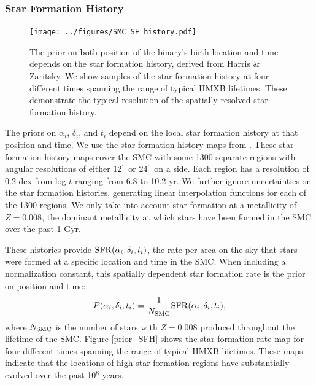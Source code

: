 \documentclass[usenatbib]{mnras}
\newcommand{\amin}{\ifmmode {^{\prime}\ }\else$^{\prime}$\fi}
\begin{document}
\subsubsection{Star Formation History}

\begin{figure}
\begin{center}
\texttt{[image: ../figures/SMC\_SF\_history.pdf]}
\caption{The prior on both position of the binary's birth location and time depends on the star formation history, derived from Harris \& Zaritsky. We show samples of the star formation history at four different times spanning the range of typical HMXB lifetimes. These demonstrate the typical resolution of the spatially-resolved star formation history.}
\label{fig:prior_SFH}
\end{center}
\end{figure}

The priors on $\alpha_i$, $\delta_i$, and $t_i$ depend on the local star formation history at that position and time. We use the star formation history maps from \citet{harris??}. These star formation history maps cover the SMC with some 1300 separate regions with angular resolutions of either 12\amin\ or 24\amin\ on a side. Each region has a resolution of 0.2 dex from log $t$ ranging from 6.8 to 10.2 yr. We further ignore uncertainties on the star formation histories, generating linear interpolation functions for each of the 1300 regions. We only take into account star formation at a metallicity of $Z=0.008$, the dominant metallicity at which stars have been formed in the SMC over the past 1 Gyr. 

These histories provide ${\rm SFR}(\alpha_i, \delta_i, t_i)$, the rate per area on the sky that stars were formed at a specific location and time in the SMC. When including a normalization constant, this spatially dependent star formation rate is the prior on position and time:
\begin{equation}
P(\alpha_i, \delta_i, t_i) = \frac{1}{N_{\rm SMC}} {\rm SFR}(\alpha_i, \delta_i, t_i),
\end{equation}
where $N_{\rm SMC}$ is the number of stars with $Z=0.008$ produced throughout the lifetime of the SMC. Figure \ref{prior_SFH} shows the star formation rate map for four different times spanning the range of typical HMXB lifetimes. These maps indicate that the locations of high star formation regions have substantially evolved over the past 10$^8$ years.




\end{document}

